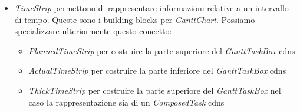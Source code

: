 \begin{description}
\begin{itemize}
    \item \emph{TimeStrip} permettono di rappresentare informazioni relative a
    un intervallo di tempo. Queste sono i building blocks per
    \emph{GanttChart}. Possiamo specializzare ulteriormente questo concetto:
    \begin{itemize}
      \item \emph{PlannedTimeStrip} per costruire la parte superiore del
      \emph{GanttTaskBox} cdns
      \item \emph{ActualTimeStrip} per costruire la parte inferiore del
      \emph{GanttTaskBox} cdns      
      \item \emph{ThickTimeStrip} per costruire la parte superiore del
      \emph{GanttTaskBox} nel caso la rappresentazione sia di un
      \emph{ComposedTask} cdns
    \end{itemize}
  \end{itemize}
\end{description}
